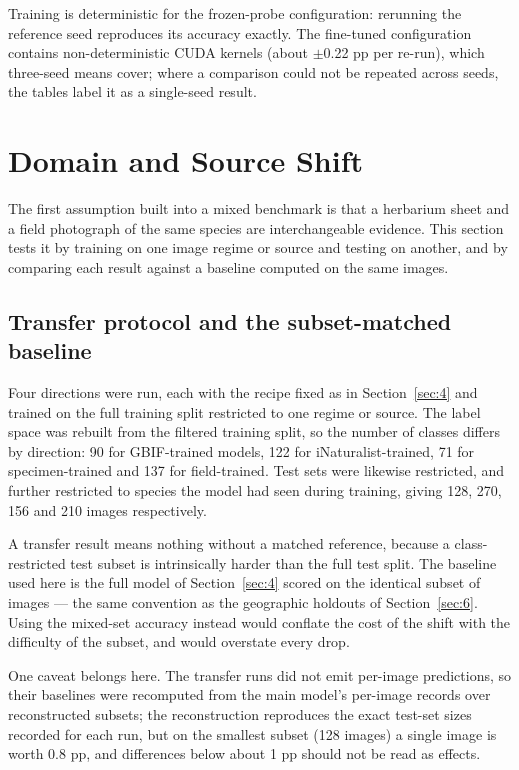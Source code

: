 \documentclass[preprint,12pt,authoryear]{elsarticle}
\begin{document}
Training is deterministic for the frozen-probe configuration: rerunning the reference seed reproduces its accuracy exactly. The fine-tuned configuration contains non-deterministic CUDA kernels (about $\pm$0.22 pp per re-run), which three-seed means cover; where a comparison could not be repeated across seeds, the tables label it as a single-seed result.

\setcounter{section}{4}

\section{Domain and Source Shift}\label{sec:5}

The first assumption built into a mixed benchmark is that a herbarium sheet and a field photograph of the same species are interchangeable evidence. This section tests it by training on one image regime or source and testing on another, and by comparing each result against a baseline computed on the same images.

\setcounter{section}{5}

\setcounter{subsection}{0}

\subsection{Transfer protocol and the subset-matched baseline}\label{sec:5.1}

Four directions were run, each with the recipe fixed as in Section~\ref{sec:4} and trained on the full training split restricted to one regime or source. The label space was rebuilt from the filtered training split, so the number of classes differs by direction: 90 for GBIF-trained models, 122 for iNaturalist-trained, 71 for specimen-trained and 137 for field-trained. Test sets were likewise restricted, and further restricted to species the model had seen during training, giving 128, 270, 156 and 210 images respectively.

A transfer result means nothing without a matched reference, because a class-restricted test subset is intrinsically harder than the full test split. The baseline used here is the full model of Section~\ref{sec:4} scored on the identical subset of images --- the same convention as the geographic holdouts of Section~\ref{sec:6}. Using the mixed-set accuracy instead would conflate the cost of the shift with the difficulty of the subset, and would overstate every drop.

One caveat belongs here. The transfer runs did not emit per-image predictions, so their baselines were recomputed from the main model's per-image records over reconstructed subsets; the reconstruction reproduces the exact test-set sizes recorded for each run, but on the smallest subset (128 images) a single image is worth 0.8 pp, and differences below about 1 pp should not be read as effects.
\end{document}

